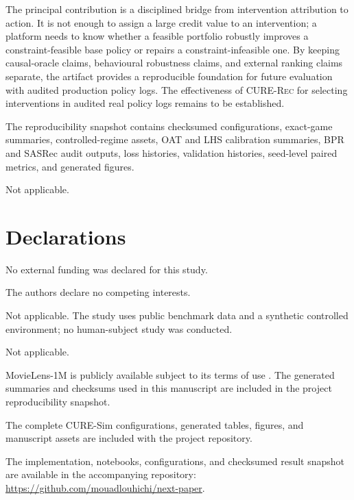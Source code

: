 \documentclass[pdflatex,sn-mathphys-num]{sn-jnl}
\theoremstyle{thmstyleone}
\theoremstyle{thmstyletwo}
\theoremstyle{thmstylethree}
\newcommand{\CURE}{\textsc{CURE-Rec}}
\begin{document}
The principal contribution is a disciplined bridge from intervention attribution to action. It is not enough to assign a large credit value to an intervention; a platform needs to know whether a feasible portfolio robustly improves a constraint-feasible base policy or repairs a constraint-infeasible one. By keeping causal-oracle claims, behavioural robustness claims, and external ranking claims separate, the artifact provides a reproducible foundation for future evaluation with audited production policy logs. The effectiveness of \CURE{} for selecting interventions in audited real policy logs remains to be established.

\backmatter

The reproducibility snapshot contains checksumed configurations, exact-game summaries, controlled-regime assets, OAT and LHS calibration summaries, BPR and SASRec audit outputs, loss histories, validation histories, seed-level paired metrics, and generated figures.

Not applicable.

\section*{Declarations}

No external funding was declared for this study.

The authors declare no competing interests.

Not applicable. The study uses public benchmark data and a synthetic controlled environment; no human-subject study was conducted.

Not applicable.

MovieLens-1M is publicly available subject to its terms of use \cite{harper2015movielens}. The generated summaries and checksums used in this manuscript are included in the project reproducibility snapshot.

The complete CURE-Sim configurations, generated tables, figures, and manuscript assets are included with the project repository.

The implementation, notebooks, configurations, and checksumed result snapshot are available in the accompanying repository: \url{https://github.com/mouadlouhichi/next-paper}.
\end{document}
